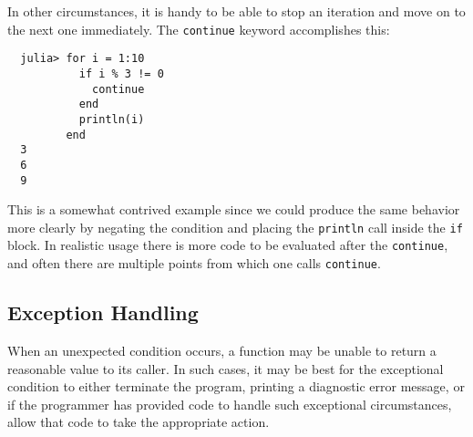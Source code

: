 \documentclass{article}
\renewcommand{\sec}[1]{\label{sec:#1}}
\begin{document}
In other circumstances, it is handy to be able to stop an iteration and move on to the next one immediately.
The \verb|continue| keyword accomplishes this:
\begin{verbatim}
  julia> for i = 1:10
           if i % 3 != 0
             continue
           end
           println(i)
         end
  3
  6
  9
\end{verbatim}
This is a somewhat contrived example since we could produce the same behavior more clearly by negating the condition and placing the \verb|println| call inside the \verb|if| block.
In realistic usage there is more code to be evaluated after the \verb|continue|, and often there are multiple points from which one calls \verb|continue|.

\subsection{Exception Handling}\sec{exception-handling}

When an unexpected condition occurs, a function may be unable to return a reasonable value to its caller.
In such cases, it may be best for the exceptional condition to either terminate the program, printing a diagnostic error message, or if the programmer has provided code to handle such exceptional circumstances, allow that code to take the appropriate action.
\end{document}
